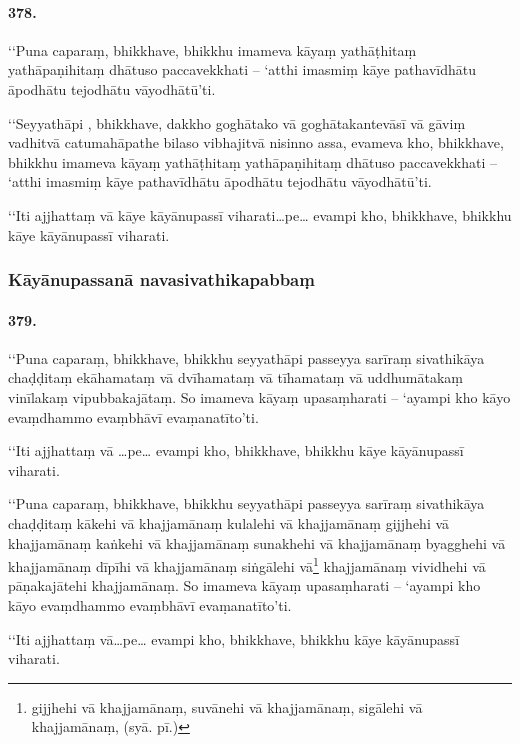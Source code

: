 \paragraph{378.} ‘‘Puna caparaṃ, bhikkhave, bhikkhu imameva kāyaṃ yathāṭhitaṃ yathāpaṇihitaṃ dhātuso paccavekkhati – ‘atthi imasmiṃ kāye pathavīdhātu āpodhātu tejodhātu vāyodhātū’ti.

‘‘Seyyathāpi , bhikkhave, dakkho goghātako vā goghātakantevāsī vā gāviṃ vadhitvā catumahāpathe bilaso vibhajitvā nisinno assa, evameva kho, bhikkhave, bhikkhu imameva kāyaṃ yathāṭhitaṃ yathāpaṇihitaṃ dhātuso paccavekkhati – ‘atthi imasmiṃ kāye pathavīdhātu āpodhātu tejodhātu vāyodhātū’ti.

‘‘Iti ajjhattaṃ vā kāye kāyānupassī viharati…pe… evampi kho, bhikkhave, bhikkhu kāye kāyānupassī viharati.


\subsubsection{Kāyānupassanā navasivathikapabbaṃ}

\paragraph{379.} ‘‘Puna caparaṃ, bhikkhave, bhikkhu seyyathāpi passeyya sarīraṃ sivathikāya chaḍḍitaṃ ekāhamataṃ vā dvīhamataṃ vā tīhamataṃ vā uddhumātakaṃ vinīlakaṃ vipubbakajātaṃ. So imameva kāyaṃ upasaṃharati – ‘ayampi kho kāyo evaṃdhammo evaṃbhāvī evaṃanatīto’ti.

‘‘Iti ajjhattaṃ vā …pe… evampi kho, bhikkhave, bhikkhu kāye kāyānupassī viharati.

‘‘Puna caparaṃ, bhikkhave, bhikkhu seyyathāpi passeyya sarīraṃ sivathikāya chaḍḍitaṃ kākehi vā khajjamānaṃ kulalehi vā khajjamānaṃ gijjhehi vā khajjamānaṃ kaṅkehi vā khajjamānaṃ sunakhehi vā khajjamānaṃ byagghehi vā khajjamānaṃ dīpīhi vā khajjamānaṃ siṅgālehi vā\footnote{gijjhehi vā khajjamānaṃ, suvānehi vā khajjamānaṃ, sigālehi vā khajjamānaṃ, (syā. pī.)} khajjamānaṃ vividhehi vā pāṇakajātehi khajjamānaṃ. So imameva kāyaṃ upasaṃharati – ‘ayampi kho kāyo evaṃdhammo evaṃbhāvī evaṃanatīto’ti.

‘‘Iti ajjhattaṃ vā…pe… evampi kho, bhikkhave, bhikkhu kāye kāyānupassī viharati.


